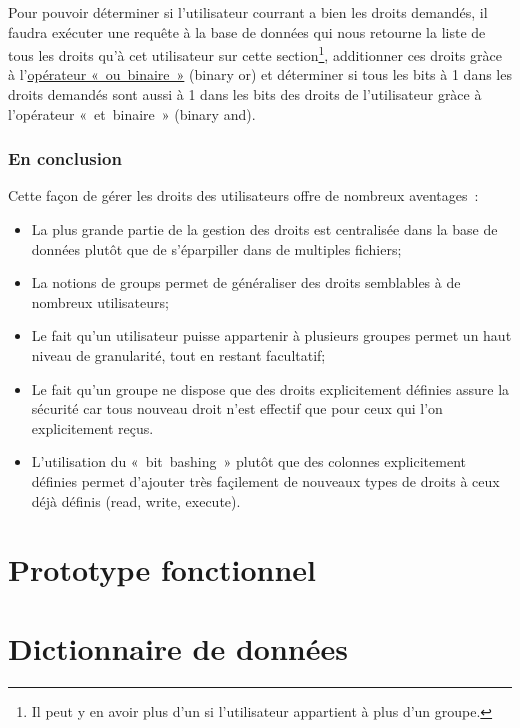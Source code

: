 \documentclass[letter, 10pt]{report}
\begin{document}
Pour pouvoir déterminer si l'utilisateur courrant a bien les droits demandés, il faudra exécuter une requête à la base de données qui nous retourne la liste de tous les droits qu'à cet utilisateur sur cette section\footnote{Il peut y en avoir plus d'un si l'utilisateur appartient à plus d'un groupe.}, additionner ces droits gràce à l'\href{http://www.php.net/manual/en/language.operators.bitwise.php}{opérateur «~ou~binaire~»} (binary or) et déterminer si tous les bits à 1 dans les droits demandés sont aussi à 1 dans les bits des droits de l'utilisateur gràce à l'opérateur «~et~binaire~» (binary and).

\subsection{En conclusion}
Cette façon de gérer les droits des utilisateurs offre de nombreux aventages~:

\begin{itemize}
	\item La plus grande partie de la gestion des droits est centralisée dans la base de données plutôt que de s'éparpiller dans de multiples fichiers;
	\item La notions de groups permet de généraliser des droits semblables à de nombreux utilisateurs;
	\item Le fait qu'un utilisateur puisse appartenir à plusieurs groupes permet un haut niveau de granularité, tout en restant facultatif;
	\item Le fait qu'un groupe ne dispose que des droits explicitement définies assure la sécurité car tous nouveau droit n'est effectif que pour ceux qui l'on explicitement reçus.
	\item L'utilisation du «~bit~bashing~» plutôt que des colonnes explicitement définies permet d'ajouter très façilement de nouveaux types de droits à ceux déjà définis (read, write, execute).
\end{itemize}

\chapter{Prototype fonctionnel}

\appendix

\chapter{Dictionnaire de données}


\listoftables
\end{document}
